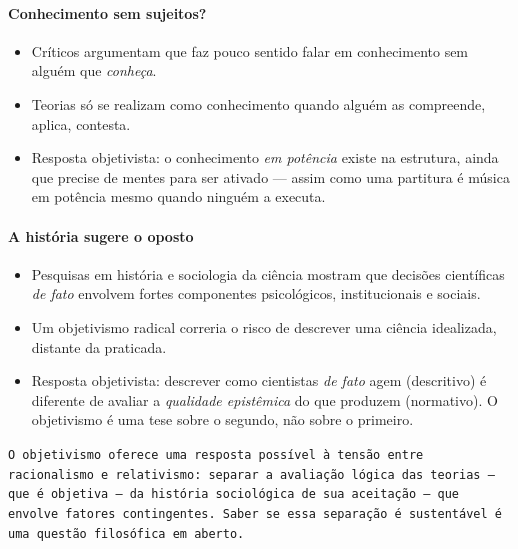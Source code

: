 \documentclass[9pt,a4paper]{extarticle}
\begin{document}
\paragraph{Conhecimento sem sujeitos?}
\begin{itemize}
    \item Críticos argumentam que faz pouco sentido falar em conhecimento sem alguém que \emph{conheça}.
    \item Teorias só se realizam como conhecimento quando alguém as compreende, aplica, contesta.
    \item Resposta objetivista: o conhecimento \emph{em potência} existe na estrutura, ainda que precise de mentes para ser ativado --- assim como uma partitura é música em potência mesmo quando ninguém a executa.
\end{itemize}

\paragraph{A história sugere o oposto}
\begin{itemize}
    \item Pesquisas em história e sociologia da ciência mostram que decisões científicas \emph{de fato} envolvem fortes componentes psicológicos, institucionais e sociais.
    \item Um objetivismo radical correria o risco de descrever uma ciência idealizada, distante da praticada.
    \item Resposta objetivista: descrever como cientistas \emph{de fato} agem (descritivo) é diferente de avaliar a \emph{qualidade epistêmica} do que produzem (normativo). O objetivismo é uma tese sobre o segundo, não sobre o primeiro.
\end{itemize}

\texttt{O objetivismo oferece uma resposta possível à tensão entre racionalismo e relativismo: separar a avaliação lógica das teorias --- que é objetiva --- da história sociológica de sua aceitação --- que envolve fatores contingentes. Saber se essa separação é sustentável é uma questão filosófica em aberto.}

   

\end{document}

